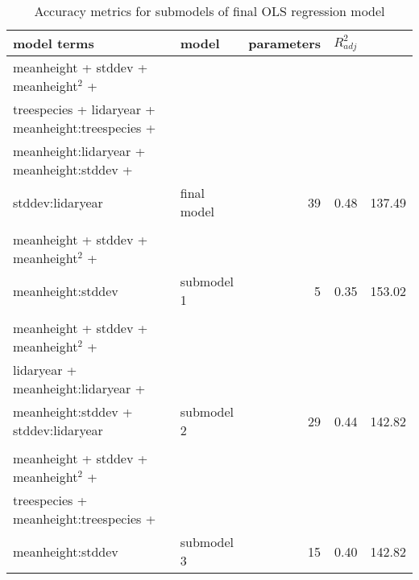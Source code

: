 \begin{table*}
\centering
\caption{Accuracy metrics for submodels of final OLS regression model} 
\label{tab:modacc_modterms}
\begin{tabular}{llrrr}
  \hline
model terms & model & parameters & $R^2_{adj}$ & \rmsecv{} \\ 
  \hline
meanheight + stddev + meanheight$^2$ + \\ treespecies + lidaryear + meanheight:treespecies + \\ meanheight:lidaryear + meanheight:stddev + \\ stddev:lidaryear & final model &  39 & 0.48 & 137.49 \\ \\
  meanheight + stddev + meanheight$^2$ + \\ meanheight:stddev & submodel 1 &   5 & 0.35 & 153.02 \\ \\
  meanheight + stddev + meanheight$^2$ + \\ lidaryear + meanheight:lidaryear + \\ meanheight:stddev + stddev:lidaryear & submodel 2 &  29 & 0.44 & 142.82 \\ \\
  meanheight + stddev + meanheight$^2$ + \\ treespecies + meanheight:treespecies + \\ meanheight:stddev & submodel 3 &  15 & 0.40 & 142.82 \\ 
   \hline
\hline
\end{tabular}
\end{table*}


